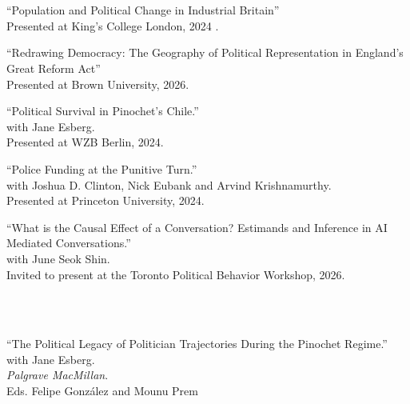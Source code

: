 \documentclass[11pt]{article}
\begin{document}
\vspace{.3in}
\begin{minipage}[t]{.21\textwidth}
	\flushright
	  \hspace*{.2in} \\
	  \hspace*{.2in} \\
\end{minipage}
\begin{minipage}[t]{.79\textwidth}
	``Population and Political Change in Industrial Britain'' \\
	 Presented at King's College London, 2024 .  \\
	\vspace{-.05in}

	``Redrawing Democracy: The Geography of Political Representation in England’s Great
Reform Act'' \\
	Presented at Brown University, 2026. \\
	\vspace{-.05in}

	``Political Survival in Pinochet's Chile.'' \\
	 with Jane Esberg. \\
	Presented at WZB Berlin, 2024. \\
	\vspace{-.05in}

	``Police Funding at the Punitive Turn.'' \\
	with Joshua D. Clinton, Nick Eubank and Arvind Krishnamurthy. \\
	Presented at Princeton University, 2024. \\
	\vspace{-.05in}

	``What is the Causal Effect of a Conversation? Estimands and Inference in AI Mediated Conversations.'' \\
	with June Seok Shin. \\
	Invited to present at the Toronto Political Behavior Workshop, 2026. \\
	\vspace{-.05in}


\end{minipage}



\vspace{.3in}
\begin{minipage}[t]{.21\textwidth}
	\flushright
	 \hspace*{.2in} \\
	 \hspace*{.2in} \\
\end{minipage}
\begin{minipage}[t]{.79\textwidth}
		``The Political Legacy of Politician Trajectories During the Pinochet Regime.'' \\
		with Jane Esberg. \\
		\emph{Palgrave MacMillan}.\\
		Eds. Felipe Gonz\'{a}lez and Mounu Prem\\
\end{minipage}
\end{document}
